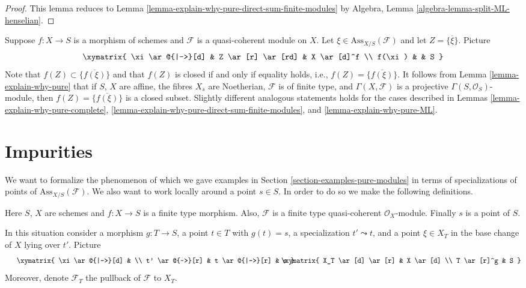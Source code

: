\begin{proof}
This lemma reduces to
Lemma \ref{lemma-explain-why-pure-direct-sum-finite-modules}
by
Algebra, Lemma \ref{algebra-lemma-split-ML-henselian}.
\end{proof}

\noindent
Suppose $f : X \to S$ is a morphism of schemes and
$\mathcal{F}$ is a quasi-coherent module on $X$.
Let $\xi \in \text{Ass}_{X/S}(\mathcal{F})$ and let $Z = \overline{\{\xi\}}$.
Picture
$$
\xymatrix{
\xi \ar@{|->}[d] & Z \ar[r] \ar[rd] & X \ar[d]^f \\
f(\xi) & & S
}
$$
Note that $f(Z) \subset \overline{\{f(\xi)\}}$ and that $f(Z)$ is closed
if and only if equality holds, i.e., $f(Z) = \overline{\{f(\xi)\}}$.
It follows from
Lemma \ref{lemma-explain-why-pure}
that if $S$, $X$ are affine, the fibres $X_s$ are Noetherian,
$\mathcal{F}$ is of finite type, and $\Gamma(X, \mathcal{F})$
is a projective $\Gamma(S, \mathcal{O}_S)$-module, then
$f(Z) = \overline{\{f(\xi)\}}$ is a closed subset.
Slightly different analogous statements holds for the cases described in
Lemmas \ref{lemma-explain-why-pure-complete},
\ref{lemma-explain-why-pure-direct-sum-finite-modules}, and
\ref{lemma-explain-why-pure-ML}.




\section{Impurities}
\label{section-impure}

\noindent
We want to formalize the phenomenon of which we gave examples in
Section \ref{section-examples-pure-modules}
in terms of specializations of points of $\text{Ass}_{X/S}(\mathcal{F})$.
We also want to work locally around a point $s \in S$. In order to do so we
make the following definitions.

\begin{situation}
\label{situation-pre-pure}
Here $S$, $X$ are schemes and $f : X \to S$ is a finite type morphism.
Also, $\mathcal{F}$ is a finite type quasi-coherent $\mathcal{O}_X$-module.
Finally $s$ is a point of $S$.
\end{situation}

\noindent
In this situation consider a morphism $g : T \to S$, a point $t \in T$
with $g(t) = s$, a specialization $t' \leadsto t$, and a point
$\xi \in X_T$ in the base change of $X$ lying over $t'$. Picture
\begin{equation}
\label{equation-impurity}
\vcenter{
\xymatrix{
\xi \ar@{|->}[d] & \\
t' \ar@{~>}[r] & t \ar@{|->}[r] & s
}
}
\quad\quad
\vcenter{
\xymatrix{
X_T \ar[d] \ar[r] & X \ar[d] \\
T \ar[r]^g & S
}
}
\end{equation}
Moreover, denote $\mathcal{F}_T$ the pullback of $\mathcal{F}$ to $X_T$.

